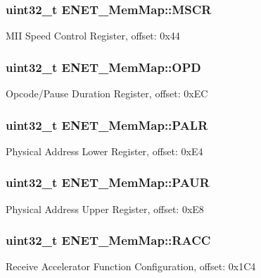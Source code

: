 \subsubsection[{M\+S\+C\+R}]{\setlength{\rightskip}{0pt plus 5cm}uint32\+\_\+t E\+N\+E\+T\+\_\+\+Mem\+Map\+::\+M\+S\+C\+R}\label{struct_e_n_e_t___mem_map_a635a1d1269e342c592757d49b5073507}
M\+I\+I Speed Control Register, offset\+: 0x44 \hypertarget{struct_e_n_e_t___mem_map_a36b7b64453feb7e43806d56ae666f152}{}
\subsubsection[{O\+P\+D}]{\setlength{\rightskip}{0pt plus 5cm}uint32\+\_\+t E\+N\+E\+T\+\_\+\+Mem\+Map\+::\+O\+P\+D}\label{struct_e_n_e_t___mem_map_a36b7b64453feb7e43806d56ae666f152}
Opcode/\+Pause Duration Register, offset\+: 0x\+E\+C \hypertarget{struct_e_n_e_t___mem_map_aeb3539c7a6972f6d038cf191a2aa6c5b}{}
\subsubsection[{P\+A\+L\+R}]{\setlength{\rightskip}{0pt plus 5cm}uint32\+\_\+t E\+N\+E\+T\+\_\+\+Mem\+Map\+::\+P\+A\+L\+R}\label{struct_e_n_e_t___mem_map_aeb3539c7a6972f6d038cf191a2aa6c5b}
Physical Address Lower Register, offset\+: 0x\+E4 \hypertarget{struct_e_n_e_t___mem_map_ab22b035762a3a6af6b1ac7f64803f771}{}
\subsubsection[{P\+A\+U\+R}]{\setlength{\rightskip}{0pt plus 5cm}uint32\+\_\+t E\+N\+E\+T\+\_\+\+Mem\+Map\+::\+P\+A\+U\+R}\label{struct_e_n_e_t___mem_map_ab22b035762a3a6af6b1ac7f64803f771}
Physical Address Upper Register, offset\+: 0x\+E8 \hypertarget{struct_e_n_e_t___mem_map_a6d7268a1bc80a6556ec3169866616a5a}{}
\subsubsection[{R\+A\+C\+C}]{\setlength{\rightskip}{0pt plus 5cm}uint32\+\_\+t E\+N\+E\+T\+\_\+\+Mem\+Map\+::\+R\+A\+C\+C}\label{struct_e_n_e_t___mem_map_a6d7268a1bc80a6556ec3169866616a5a}
Receive Accelerator Function Configuration, offset\+: 0x1\+C4 \hypertarget{struct_e_n_e_t___mem_map_a0cb46a60ee6f66278066bd85b782756c}{}
